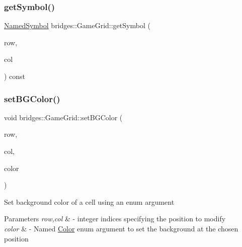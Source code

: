 \mbox{\label{classbridges_1_1_game_grid_a9e3450aae2d92f781b298a5cd0aa5b62}} 
\subsubsection{\texorpdfstring{getSymbol()}{getSymbol()}}
{\footnotesize\ttfamily \mbox{\hyperlink{namespacebridges_acfb0a4f7877d8f63de3e6862004c50ed}{Named\+Symbol}} bridges\+::\+Game\+Grid\+::get\+Symbol (\begin{DoxyParamCaption}\item[{int}]{row,  }\item[{int}]{col }\end{DoxyParamCaption}) const\hspace{0.3cm}{\ttfamily [inline]}}

\mbox{\label{classbridges_1_1_game_grid_aa877047d613ace46190c161f0c31a1b3}} 
\subsubsection{\texorpdfstring{setBGColor()}{setBGColor()}}
{\footnotesize\ttfamily void bridges\+::\+Game\+Grid\+::set\+B\+G\+Color (\begin{DoxyParamCaption}\item[{int}]{row,  }\item[{int}]{col,  }\item[{\mbox{\hyperlink{namespacebridges_ad811207d8898a7fd6b72a74725e68357}{Named\+Color}}}]{color }\end{DoxyParamCaption})\hspace{0.3cm}{\ttfamily [inline]}}

Set background color of a cell using an enum argument


\begin{DoxyParams}{Parameters}
{\em row,col} & -\/ integer indices specifying the position to modify \\
\hline
{\em color} & -\/ Named \mbox{\hyperlink{classbridges_1_1_color}{Color}} enum argument to set the background at the chosen position \\
\hline
\end{DoxyParams}
\mbox{\label{classbridges_1_1_game_grid_aff88dfdc61c69af5881665d937f07ee4}} 
